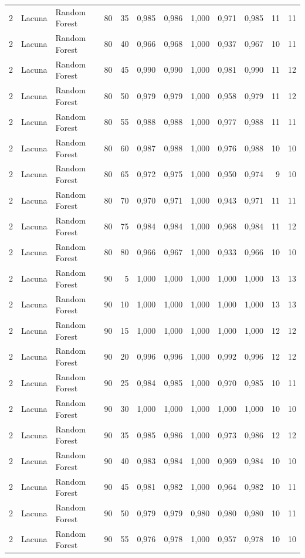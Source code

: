 \begin{longtable}{@{}rllrrrrrrrrr@{}}
2 & Lacuna & Random Forest & 80 & 35 & 0,985 & 0,986 & 1,000 & 0,971 & 0,985 & 11 & 11 \\
2 & Lacuna & Random Forest & 80 & 40 & 0,966 & 0,968 & 1,000 & 0,937 & 0,967 & 10 & 11 \\
2 & Lacuna & Random Forest & 80 & 45 & 0,990 & 0,990 & 1,000 & 0,981 & 0,990 & 11 & 12 \\
2 & Lacuna & Random Forest & 80 & 50 & 0,979 & 0,979 & 1,000 & 0,958 & 0,979 & 11 & 12 \\
2 & Lacuna & Random Forest & 80 & 55 & 0,988 & 0,988 & 1,000 & 0,977 & 0,988 & 11 & 11 \\
2 & Lacuna & Random Forest & 80 & 60 & 0,987 & 0,988 & 1,000 & 0,976 & 0,988 & 10 & 10 \\
2 & Lacuna & Random Forest & 80 & 65 & 0,972 & 0,975 & 1,000 & 0,950 & 0,974 & 9 & 10 \\
2 & Lacuna & Random Forest & 80 & 70 & 0,970 & 0,971 & 1,000 & 0,943 & 0,971 & 11 & 11 \\
2 & Lacuna & Random Forest & 80 & 75 & 0,984 & 0,984 & 1,000 & 0,968 & 0,984 & 11 & 12 \\
2 & Lacuna & Random Forest & 80 & 80 & 0,966 & 0,967 & 1,000 & 0,933 & 0,966 & 10 & 10 \\
2 & Lacuna & Random Forest & 90 & 5 & 1,000 & 1,000 & 1,000 & 1,000 & 1,000 & 13 & 13 \\
2 & Lacuna & Random Forest & 90 & 10 & 1,000 & 1,000 & 1,000 & 1,000 & 1,000 & 13 & 13 \\
2 & Lacuna & Random Forest & 90 & 15 & 1,000 & 1,000 & 1,000 & 1,000 & 1,000 & 12 & 12 \\
2 & Lacuna & Random Forest & 90 & 20 & 0,996 & 0,996 & 1,000 & 0,992 & 0,996 & 12 & 12 \\
2 & Lacuna & Random Forest & 90 & 25 & 0,984 & 0,985 & 1,000 & 0,970 & 0,985 & 10 & 11 \\
2 & Lacuna & Random Forest & 90 & 30 & 1,000 & 1,000 & 1,000 & 1,000 & 1,000 & 10 & 10 \\
2 & Lacuna & Random Forest & 90 & 35 & 0,985 & 0,986 & 1,000 & 0,973 & 0,986 & 12 & 12 \\
2 & Lacuna & Random Forest & 90 & 40 & 0,983 & 0,984 & 1,000 & 0,969 & 0,984 & 10 & 10 \\
2 & Lacuna & Random Forest & 90 & 45 & 0,981 & 0,982 & 1,000 & 0,964 & 0,982 & 10 & 11 \\
2 & Lacuna & Random Forest & 90 & 50 & 0,979 & 0,979 & 0,980 & 0,980 & 0,980 & 10 & 11 \\
2 & Lacuna & Random Forest & 90 & 55 & 0,976 & 0,978 & 1,000 & 0,957 & 0,978 & 10 & 10 \\

\end{longtable}
